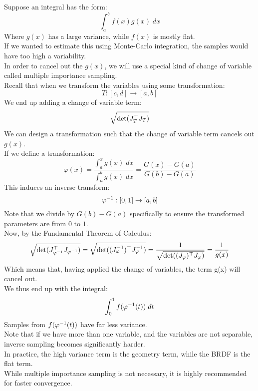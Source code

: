 \documentclass[12pt]{article}
\begin{document}
Suppose an integral has the form:
\[ \int_a^b f(x)g(x)\;dx \]
Where $g(x)$ has a large variance,
while $f(x)$ is mostly flat. \\

If we wanted to estimate this using
Monte-Carlo integration, the samples would have
too high a variability. \\

In order to cancel out the $g(x)$,
we will use a special kind of change of variable
called multiple importance sampling. \\

Recall that when we transform the variables
using some transformation:
\[ T: [c, d] \to [a, b] \]
We end up adding a change of variable term:
\[ \sqrt{\vs{100}\det(J_T^\top J_T)} \]
We can design a transformation such that the
change of variable term cancels out $g(x)$. \\

If we define a transformation:
\[ \varphi(x) = \dfrac{\int_a^x g(x) \;dx}
{\int_a^b g(x) \;dx}
= \dfrac{G(x) - G(a)}
{G(b) - G(a)} \]
This induces an inverse transform:
\[ \varphi^{-1}: [0, 1] \to [a, b] \]
Note that we divide by $G(b) - G(a)$
specifically to ensure the transformed parameters
are from $0$ to $1$. \\

Now, by the Fundamental Theorem of Calculus:
\[ \sqrt{\det(J_{\varphi^{-1}}^\top J_{\varphi^{-1}})}
= \sqrt{\det((J_{\varphi}^{-1})^\top J_{\varphi}^{-1})}
= \dfrac{1}{\sqrt{\det((J_{\varphi})^\top J_{\varphi})}}
= \dfrac{1}{g(x)}\]
Which means that, having applied the
change of variables, the term g(x)
will cancel out. \\

We thus end up with the integral:
\[ \int_0^1 f(\varphi^{-1}(t)) \; dt \]
Samples from $f(\varphi^{-1}(t))$
have far less variance. \\

Note that if we have more than one variable,
and the variables are not separable,
inverse sampling becomes significantly harder. \\

In practice, the high variance term is
the geometry term, while the BRDF is the flat term. \\

While multiple importance sampling is not necessary, 
it is highly recommended for faster convergence. \\

\newpage
\end{document}
